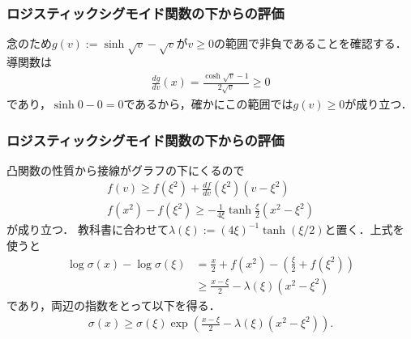 \documentclass[10pt,usepdftitle=false,hyperref={unicode}]{beamer}
\newcommand{\parentheses}[1]{\left(#1\right)}
\begin{document}
\begin{frame}
\frametitle{ロジスティックシグモイド関数の下からの評価}
念のため$g\parentheses{v} := \sinh \sqrt{v} - \sqrt{v}$が$v \geq 0$の範囲で非負であることを確認する．
導関数は
\begin{align*}
    \frac{dg}{dv}\parentheses{x} = \frac{\cosh \sqrt{v} - 1}{2\sqrt{v}} \geq 0
\end{align*}
であり，$\sinh 0 - 0 = 0$であるから，確かにこの範囲では$g\parentheses{v} \geq 0$が成り立つ．

\smallskip

\begin{center}
\end{center}
\end{frame}

\begin{frame}
\frametitle{ロジスティックシグモイド関数の下からの評価}
凸関数の性質から接線がグラフの下にくるので
\begin{gather*}
    f\parentheses{v} \geq f\parentheses{\xi^2} + \frac{df}{dv}\parentheses{\xi^2}\parentheses{v - \xi^2} \\
    f\parentheses{x^2} - f\parentheses{\xi^2} \geq -\frac{1}{4\xi}\tanh\frac{\xi}{2}\parentheses{x^2 - \xi^2}
\end{gather*}
が成り立つ．
教科書に合わせて$\lambda\parentheses{\xi} := \parentheses{4\xi}^{-1}\tanh\parentheses{\xi/2}$と置く．上式を使うと
\begin{align*}
    \log\sigma\parentheses{x} - \log\sigma\parentheses{\xi}
    &= \frac{x}{2} + f\parentheses{x^2} - \parentheses{\frac{\xi}{2} + f\parentheses{\xi^2}} \\
    &\geq \frac{x - \xi}{2} - \lambda\parentheses{\xi}\parentheses{x^2 - \xi^2}
\end{align*}
であり，両辺の指数をとって以下を得る．
\begin{align}
    \sigma\parentheses{x}
    \geq \sigma\parentheses{\xi}\exp\parentheses{\frac{x - \xi}{2} - \lambda\parentheses{\xi}\parentheses{x^2 - \xi^2}}. \tag{10.144} \label{inf}
\end{align}
\end{frame}
\end{document}
